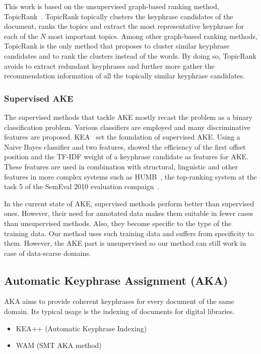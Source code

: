       This work is based on the unsupervised graph-based ranking method,
      TopicRank~\cite{bougouin2013topicrank}. TopicRank topically clusters the
      keyphrase candidates of the document, ranks the topics and extract the
      most representative keyphrase for each of the $N$ most important topics.
      Among other graph-based ranking methods, TopicRank is the only method that
      proposes to cluster similar keyphrase candidates and to rank the clusters
      instead of the words. By doing so, TopicRank avoids to extract redundant
      keyphrases and further more gather the recommendation information of all
      the topically similar keyphrase candidates.

    \subsubsection{Supervised AKE}
    \label{subsubsec:supervised_ake}
      The supervised methods that tackle AKE mostly recast the problem as a
      binary classification problem. Various classifiers are employed and many
      discriminative features are proposed. KEA~\cite{witten1999kea} set the
      foundation of supervised AKE. Using a Naive Bayes classifier and two
      features,  showed the efficiency of the first
      offset position and the TF-IDF weight of a keyphrase candidate as features
      for AKE. These features are used in combination with structural,
      linguistic and other features in more complex systems such as
      HUMB~\cite{lopez2010humb}, the top-ranking system at the task 5 of the
      SemEval 2010 evaluation compaign~\cite{kim2010semeval}.

      In the current state of AKE, supervised methods perform better than
      supervised ones. However, their need for annotated data makes them
      suitable in fewer cases than unsupervised methods. Also, they become
      specific to the type of the training data. Our method uses such training
      data and suffers from specificity to them. However, the AKE part is
      unsupervised so our method can still work in case of data-scarse domains.

  \subsection{Automatic Keyphrase Assignment (AKA)}
  \label{subsec:aka}
    AKA aims to provide coherent keyphrases for every document of the same
    domain. Its typical usage is the indexing of documents for digital
    libraries. 
    \begin{itemize}
      \item{KEA++ (Automatic Keyphrase Indexing)}
      \item{WAM (SMT AKA method) }
    \end{itemize}

